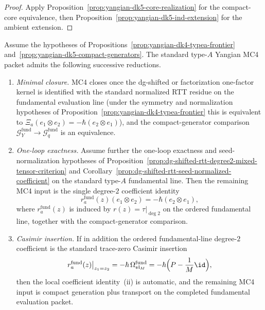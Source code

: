 \begin{proof}
Apply Proposition~\ref{prop:yangian-dk5-core-realization} for the
compact-core equivalence, then
Proposition~\ref{prop:yangian-dk5-ind-extension} for the ambient
extension.
\end{proof}

\begin{corollary}
\label{cor:yangian-typea-mc4-closure-criterion}%
\label{cor:yangian-typea-degree2-plus-generators}%
\label{cor:yangian-typea-casimir-plus-generators}%
\label{cor:yangian-typea-factorization-local-closure}%
\label{cor:yangian-typea-shared-seed-plus-generators}%
Assume the hypotheses of
Propositions~\ref{prop:yangian-dk4-typea-frontier}
and~\ref{prop:yangian-dk5-compact-generators}.
The standard type-$A$ Yangian MC4 packet admits the following
successive reductions.
\begin{enumerate}[label=\textup{(\roman*)}]
\item\emph{Minimal closure.}
 MC4 closes once the dg-shifted or factorization one-factor kernel is
 identified with the standard normalized RTT residue on the
 fundamental evaluation line (under the symmetry and normalization
 hypotheses of
 Proposition~\ref{prop:yangian-dk4-typea-frontier} this is equivalent
 to
 \(
 \Xi_a(e_1\otimes e_2)=-\hbar(e_2\otimes e_1)
 \)), and the compact-generator comparison
 $\mathcal{G}^{\mathrm{fund}}_Y \to \mathcal{G}^{\mathrm{fund}}_q$
 is an equivalence.

\item\emph{One-loop exactness.}
 Assume further the one-loop exactness and seed-normalization
 hypotheses of
 Proposition~\ref{prop:dg-shifted-rtt-degree2-mixed-tensor-criterion}
 and
 Corollary~\ref{prop:dg-shifted-rtt-seed-normalized-coefficient} on
 the standard type-$A$ fundamental line. Then the remaining MC4
 input is the single degree-$2$ coefficient identity
 \[
 r_a^{\mathrm{fund}}(z)(e_1\otimes e_2)
 =
 -\hbar(e_2\otimes e_1),
 \]
 where $r_a^{\mathrm{fund}}(z)$ is induced by
 $r(z)=\tau|_{\deg 2}$ on the ordered fundamental line, together
 with the compact-generator comparison.

\item\emph{Casimir insertion.}
 If in addition the ordered fundamental-line degree-$2$ coefficient is
 the standard trace-zero Casimir insertion
 \[
 r_a^{\mathrm{fund}}(z)\big|_{z_1=z_2}
 =
 -\hbar\,\Omega_{\mathfrak{sl}_M}^{\mathrm{fund}}
 =
 -\hbar\Bigl(P-\frac{1}{M}\id\Bigr),
 \]
 then the local coefficient identity~\textup{(ii)} is automatic, and
 the remaining MC4 input is compact generation plus transport on the
 completed fundamental evaluation packet.


\end{enumerate}
\end{corollary}
